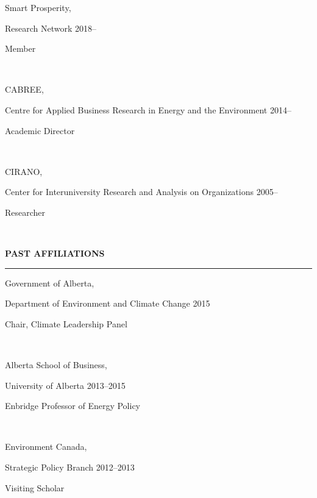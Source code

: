 \documentclass{article}[12pt]
\newcommand{\negind}{\hspace*{-15pt}}
\newcommand{\experience}[4]{\negind \begin{bf} #1, \end{bf} #2 \hfill  #3

\hfill \parbox[b]{.93\textwidth}{ #4 }\hfill\\[-.25ex]}
\begin{document}
\experience{Smart Prosperity}{Research Network}{2018--}{Member}

\experience{CABREE}{Centre for Applied Business Research in Energy and the Environment}{2014--}{Academic Director} %

\experience{CIRANO}{Center for Interuniversity Research and Analysis on Organizations}{2005--}{Researcher} %






\bigskip                                                            %

\noindent \textbf{{\large PAST AFFILIATIONS}}

\medskip
{\large\scshape\hrule\vspace{0.8\baselineskip}} %
\bigskip                                                            %

\experience{Government of Alberta}{Department of Environment and Climate Change}{2015}{Chair, Climate Leadership Panel} %

\experience{Alberta School of Business}{University of Alberta}{2013--2015}{Enbridge Professor of Energy Policy} %

\experience{Environment Canada}{Strategic Policy Branch}{2012--2013}{Visiting Scholar} %
\end{document}
